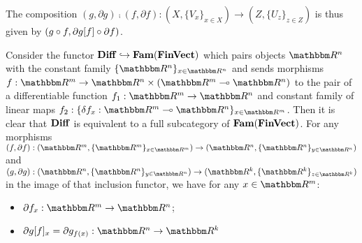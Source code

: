 \noindent The composition $(g, \partial g) \comp (f, \partial f): (X, \{V_x\}_{x \in X}) \to (Z, \{U_z\}_{z
\in Z})$ is thus given by $(g \circ f, \partial g[f] \circ \partial f)$.

Consider the functor $\mathbf{Diff} \hookrightarrow \mathbf{Fam}(\mathbf{FinVect})$ which pairs objects $\RR^n$ with the constant
family $\{\RR^n\}_{x \in \RR^n}$ and sends morphisms $f: \RR^m \to \RR^n \times (\RR^m \linearto \RR^n)$ to
the pair of a differentiable function $f_1: \RR^m \to \RR^n$ and constant family of linear maps $f_2: \{\delta
f_x: \RR^m \linearto \RR^n\}_{x \in \RR^m}$. Then it is clear that $\mathbf{Diff}$ is equivalent to a full subcategory
of $\mathbf{Fam}(\mathbf{FinVect})$. For any morphisms $(f, \partial f): (\RR^m, \{\RR^m\}_{x \in \RR^m}) \to (\RR^n,
\{\RR^n\}_{y \in \RR^n})$ and $(g, \partial g): (\RR^n, \{\RR^n\}_{y \in \RR^n}) \to (\RR^k, \{\RR^k\}_{z \in
\RR^k})$ in the image of that inclusion functor, we have for any $x \in \RR^m$:
\begin{itemize}
\item $\partial f_x: \RR^m \to \RR^n$;
\item $\reindex{\partial g}{f}_x = \partial g_{f(x)}: \RR^n \to \RR^k$
\end{itemize}

